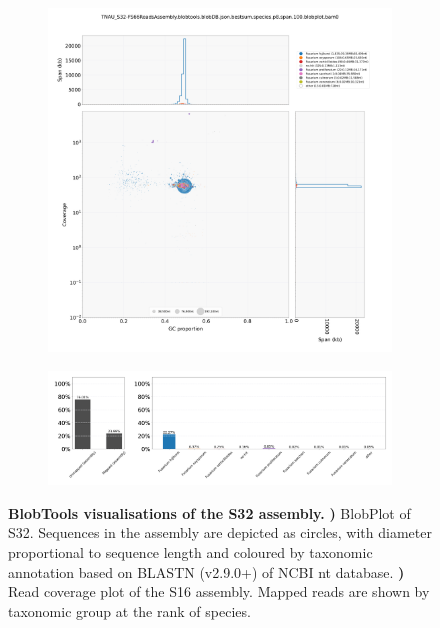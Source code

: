 \begin{figure}[hp!]
    \centering
    \begin{subfigure}[]{0.99\textwidth}
        \centering
        \includegraphics[width=\textwidth]{Appendices/TNAU_S32-FS66ReadsAssembly.blobtools.blobDB.json.bestsum.species.p8.span.100.blobplot.bam0.png}
        \caption{}
        \label{fig:BlobPlot-S32}
    \end{subfigure}
    \begin{subfigure}[]{0.9\textwidth}
        \centering
        \includegraphics[width=\textwidth]{Appendices/TNAU_S32-FS66ReadsAssembly.blobtools.blobDB.json.bestsum.species.p8.span.100.blobplot.read_cov.bam0.png}
        \caption{}
        \label{fig:BlobPlot_readcov-S32}
    \end{subfigure}
    \caption[BlobTools visualisations of the S32 assembly]{\textbf{BlobTools visualisations of the S32 assembly.}
        \textbf{) }BlobPlot of S32. Sequences in the assembly are depicted as circles, with diameter proportional to sequence length and coloured by taxonomic annotation based on BLASTN (v2.9.0+) of NCBI nt database.
        \textbf{)} Read coverage plot of the S16 assembly. Mapped reads are shown by taxonomic group at the rank of species.}
        \label{fig:S32:BlobTools}
\end{figure}
